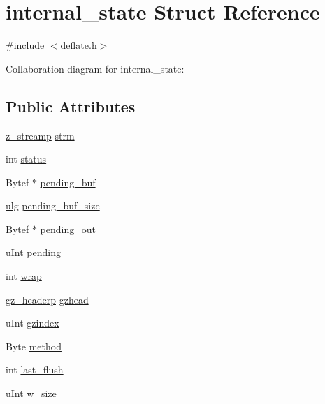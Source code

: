 \hypertarget{structinternal__state}{}\section{internal\+\_\+state Struct Reference}
\label{structinternal__state}


{\ttfamily \#include $<$deflate.\+h$>$}



Collaboration diagram for internal\+\_\+state\+:
\subsection*{Public Attributes}
\begin{DoxyCompactItemize}
\item 
\hyperlink{zlib_8h_a6ede25c84d3c9f8632305866acffb1d6}{z\+\_\+streamp} \hyperlink{structinternal__state_aaf558a49ab8c6caea3d131c6b913db42}{strm}
\item 
int \hyperlink{structinternal__state_a8756cacdbac452a2633f87e06fae6c52}{status}
\item 
Bytef $\ast$ \hyperlink{structinternal__state_ae5f393e8d0d569da6038749768f65b94}{pending\+\_\+buf}
\item 
\hyperlink{zutil_8h_abd6f60bf9450af2ecb94097a32c19a64}{ulg} \hyperlink{structinternal__state_a9100ecccf2f8bb474f0bcc7c69f55c27}{pending\+\_\+buf\+\_\+size}
\item 
Bytef $\ast$ \hyperlink{structinternal__state_a6e15ed78675c3c7bdb312623b5eceb7a}{pending\+\_\+out}
\item 
u\+Int \hyperlink{structinternal__state_ac92f5b70c269be4685539daef10b15a3}{pending}
\item 
int \hyperlink{structinternal__state_ae80327ea7ad4ad0ef5baeef5ef3a6807}{wrap}
\item 
\hyperlink{zlib_8h_a40e9dcc294796d99b25e98fb06477fc8}{gz\+\_\+headerp} \hyperlink{structinternal__state_ac023d0c9e6112dfe6cbd049a56484997}{gzhead}
\item 
u\+Int \hyperlink{structinternal__state_a5e09188a83aadfcb0db60b0765596aa1}{gzindex}
\item 
Byte \hyperlink{structinternal__state_aeb38f8a255e975e703595577ea43220b}{method}
\item 
int \hyperlink{structinternal__state_aa9517fd4120306e1f07a05563a6fe40b}{last\+\_\+flush}
\item 
u\+Int \hyperlink{structinternal__state_a875579bf4d0e9d9f9c04ff288d22bb90}{w\+\_\+size}
\item 

\end{DoxyCompactItemize}
